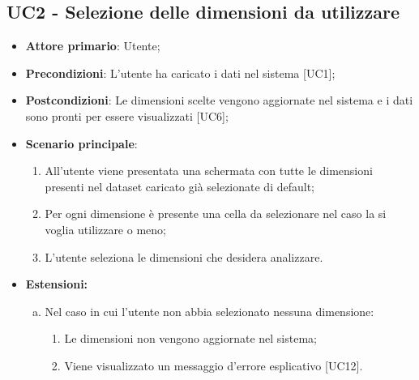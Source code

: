 \subsection{UC2 - Selezione delle dimensioni da utilizzare}
\begin{itemize}
	\item \textbf{Attore primario}: Utente;
	\item \textbf{Precondizioni}: L'utente ha caricato i dati nel sistema [UC1];
	\item \textbf{Postcondizioni}: Le dimensioni scelte vengono aggiornate nel sistema e i dati sono pronti per essere visualizzati [UC6];
	\item \textbf{Scenario principale}:
		\begin{enumerate}
			\item All'utente viene presentata una schermata con tutte le dimensioni presenti nel dataset caricato già selezionate di default;
			\item Per ogni dimensione è presente una cella da selezionare nel caso la si voglia utilizzare o meno;
			\item L'utente seleziona le dimensioni che desidera analizzare.
		\end{enumerate}
	\item \textbf{Estensioni:}
		\begin{enumerate}[(a)]
			\item Nel caso in cui l'utente non abbia selezionato nessuna dimensione:
			\begin{enumerate}[1.]
				\item Le dimensioni non vengono aggiornate nel sistema;
				\item Viene visualizzato un messaggio d'errore esplicativo [UC12].
			\end{enumerate}
		\end{enumerate}
\end{itemize}